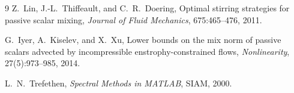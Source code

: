 \documentclass[12pt,a4paper]{article}
\theoremstyle{definition}
\begin{document}
\clearpage

\begin{thebibliography}{9}
Z.~Lin, J.-L.~Thiffeault, and C.~R.~Doering,
\newblock Optimal stirring strategies for passive scalar mixing,
\newblock \emph{Journal of Fluid Mechanics}, 675:465--476, 2011.

G.~Iyer, A.~Kiselev, and X.~Xu,
\newblock Lower bounds on the mix norm of passive scalars advected by
incompressible enstrophy-constrained flows,
\newblock \emph{Nonlinearity}, 27(5):973--985, 2014.

L.~N.~Trefethen,
\newblock \emph{Spectral Methods in MATLAB},
\newblock SIAM, 2000.
\end{thebibliography}
\end{document}
